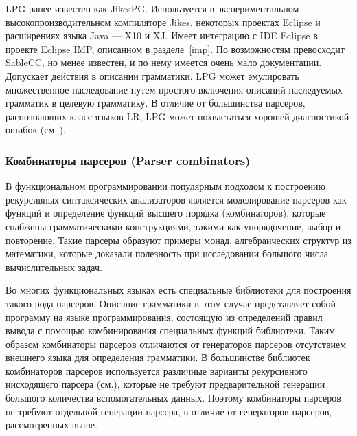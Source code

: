 \documentclass[a4paper,12pt,titlepage]{extarticle}
\begin{document}
LPG ранее известен как JikesPG. Используется в экспериментальном
высокопроизводительном компиляторе Jikes, некоторых проектах
Eclipse и расширениях языка Java --- X10 и XJ. Имеет интеграцию с IDE Eclipse в
проекте Eclipse IMP, описанном в разделе~\ref{imp}. По возможностям превосходит
SableCC, но менее известен, и по нему имеется очень мало документации.
Допускает действия в описании грамматики. LPG может эмулировать множественное
наследование путем простого включения описаний наследуемых грамматик в целевую
грамматику. В отличие от большинства парсеров, распознающих класс языков LR,
LPG может похвастаться хорошей диагностикой ошибок (см~\cite{lpgerr}).

\subsubsection*{Комбинаторы парсеров (Parser combinators)}
В функциональном программировании популярным подходом к построению рекурсивных
синтаксических анализаторов является моделирование парсеров как функций и
определение функций высшего порядка (комбинаторов), которые снабжены
грамматическими конструкциями, такими как упорядочение, выбор и повторение.
Такие парсеры образуют примеры монад, алгебраических структур из математики,
которые доказали полезность при исследовании большого числа вычислительных
задач. 

Во многих функциональных языках есть специальные библиотеки для построения
такого рода парсеров. Описание грамматики в этом случае представляет собой
программу на языке программирования, состоящую из определений правил вывода с
помощью комбинирования специальных функций библиотеки. 
Таким образом комбинаторы парсеров отличаются от генераторов парсеров 
отсутствием внешнего языка для определения грамматики.
В большинстве библиотек комбинаторов парсеров используется различные варианты
рекурсивного нисходящего парсера (см.\cite{recdescp}), которые не требуют
предварительной генерации большого количества вспомогательных данных. Поэтому
комбинаторы парсеров не требуют отдельной генерации парсера, в отличие от
генераторов парсеров, рассмотренных выше.
\end{document}
